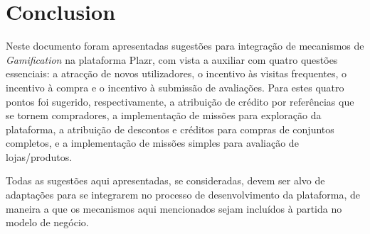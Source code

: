 \section{Conclusion}
Neste documento foram apresentadas sugestões para integração de mecanismos de \textit{Gamification} na plataforma Plazr, com vista a auxiliar com quatro questões essenciais: a atracção de novos utilizadores, o incentivo às visitas frequentes, o incentivo à compra e o incentivo à submissão de avaliações.
Para estes quatro pontos foi sugerido, respectivamente, a atribuição de crédito por referências que se tornem compradores, a implementação de missões para exploração da plataforma, a atribuição de descontos e créditos para compras de conjuntos completos, e a implementação de missões simples para avaliação de lojas/produtos.

Todas as sugestões aqui apresentadas, se consideradas, devem ser alvo de adaptações para se integrarem no processo de desenvolvimento da plataforma, de maneira a que os mecanismos aqui mencionados sejam incluídos à partida no modelo de negócio.